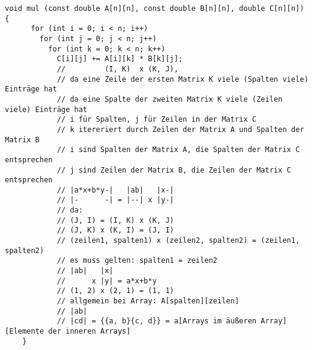 \documentclass[varwidth=17cm, convert]{standalone}
\begin{document}
  \begin{BVerbatim}[gobble=4]
    void mul (const double A[n][n], const double B[n][n], double C[n][n]) {
      for (int i = 0; i < n; i++)
        for (int j = 0; j < n; j++)
          for (int k = 0; k < n; k++)
            C[i][j] += A[i][k] * B[k][j];
            //         (I, K)  x (K, J),
            // da eine Zeile der ersten Matrix K viele (Spalten viele) Einträge hat
            // da eine Spalte der zweiten Matrix K viele (Zeilen viele) Einträge hat
            // i für Spalten, j für Zeilen in der Matrix C
            // k itereriert durch Zeilen der Matrix A und Spalten der Matrix B
            // i sind Spalten der Matrix A, die Spalten der Matrix C entsprechen
            // j sind Zeilen der Matrix B, die Zeilen der Matrix C entsprechen
            // |a*x+b*y-|   |ab|   |x-|
            // |-      -| = |--| x |y-|
            // da:
            // (J, I) = (I, K) x (K, J)
            // (J, K) x (K, I) = (J, I)
            // (zeilen1, spalten1) x (zeilen2, spalten2) = (zeilen1, spalten2)
            // es muss gelten: spalten1 = zeilen2
            // |ab|   |x|
            //      x |y| = a*x+b*y
            // (1, 2) x (2, 1) = (1, 1)
            // allgemein bei Array: A[spalten][zeilen]
            // |ab|
            // |cd| = {{a, b}{c, d}} = a[Arrays im äußeren Array][Elemente der inneren Arrays]
    }
  \end{BVerbatim}
\end{document}
